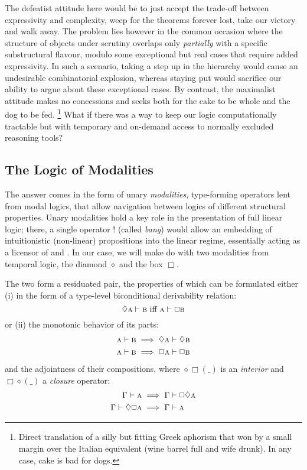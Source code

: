 The defeatist attitude here would be to just accept the trade-off between expressivity and complexity, weep for the theorems forever lost, take our victory and walk away.
The problem lies however in the common occasion where the structure of objects under scrutiny overlaps only \textit{partially} with a specific substructural flavour, modulo some exceptional but real cases that require added expressivity.
In such a scenario, taking a step up in the hierarchy would cause an undesirable combinatorial explosion, whereas staying put would sacrifice our ability to argue about these exceptional cases. 
By contrast, the maximalist attitude makes no concessions and seeks both for the cake to be whole and the dog to be fed.%
\footnote{Direct translation of a silly but fitting Greek aphorism that won by a small margin over the Italian equivalent (wine barrel full and wife drunk). In any case, cake is bad for dogs.}
What if there was a way to keep our logic computationally tractable but with temporary and on-demand access to normally excluded reasoning tools?

\subsection{The Logic of Modalities}
The answer comes in the form of unary \textit{modalities}, type-forming operators lent from modal logics, that allow navigation between logics of different structural properties.
Unary modalities hold a key role in the presentation of full linear logic; there, a single operator $!$ (called \textit{bang}) would allow an embedding of intuitionistic (non-linear) propositions into the linear regime, essentially acting as a licensor of \Contraction{} and \Weakening{}.
In our case, we will make do with two modalities from temporal logic, the diamond $\diamond$ and the box $\Box$.

The two form a residuated pair, the properties of which can be formulated either (i) in the form of a type-level biconditional derivability relation:
\begin{equation}
		\diamond \prop{a} \vdash \prop{b}\text{ iff }\prop{a} \vdash \Box\prop{b}
\end{equation}
or (ii) the monotonic behavior of its parts:
\begin{align}
		\prop{a} \vdash \prop{b} & \implies \diamond \prop{a}\vdash \diamond\prop{b}\\
		\prop{a} \vdash \prop{b} & \implies \Box{\prop{a}}\vdash \Box\prop{b}
\end{align}
and the adjointness of their compositions, where $\diamond\Box(\_)$ is an \textit{interior} and $\Box\diamond(\_)$ a \textit{closure} operator:
\begin{align}
		\Gamma \vdash \prop{a} 				& \implies \Gamma \vdash \Box\diamond\prop{a}\\
		\Gamma \vdash \diamond\Box\prop{a} & \implies \Gamma \vdash \prop{a}
\end{align}

